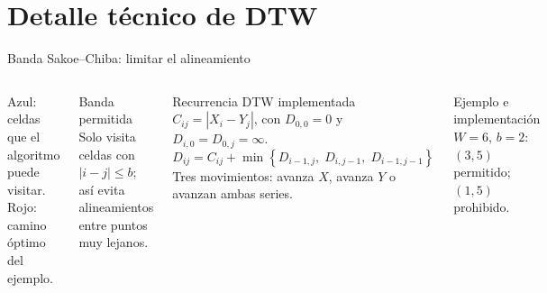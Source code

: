 \documentclass[aspectratio=169,11pt]{beamer}
\begin{document}
\section{Detalle técnico de DTW}
\begin{frame}{Banda Sakoe--Chiba: limitar el alineamiento}
  \begin{columns}[T,onlytextwidth]
      \centering

      {\tiny Azul: celdas que el algoritmo puede visitar. Rojo: camino óptimo del ejemplo.}

      \begin{block}{Banda permitida}
        \scriptsize
        Solo visita celdas con $|i-j|\leq b$; así evita alineamientos entre puntos muy lejanos.
      \end{block}

      \begin{exampleblock}{Recurrencia DTW implementada}
        \tiny
        $C_{ij}=|X_i-Y_j|$, con
        $D_{0,0}=0$ y $D_{i,0}=D_{0,j}=\infty$.
        \[
          \boxed{D_{ij}=C_{ij}+\min\!\left\{
          D_{i-1,j},\;D_{i,j-1},\;D_{i-1,j-1}\right\}}
        \]
        Tres movimientos: avanza $X$, avanza $Y$ o avanzan ambas series.
      \end{exampleblock}

      \begin{alertblock}{Ejemplo e implementación}
        \tiny
        $W=6$, $b=2$: $(3,5)$ permitido; $(1,5)$ prohibido.\\[-1pt]
      \end{alertblock}
  \end{columns}
\end{frame}
\end{document}
